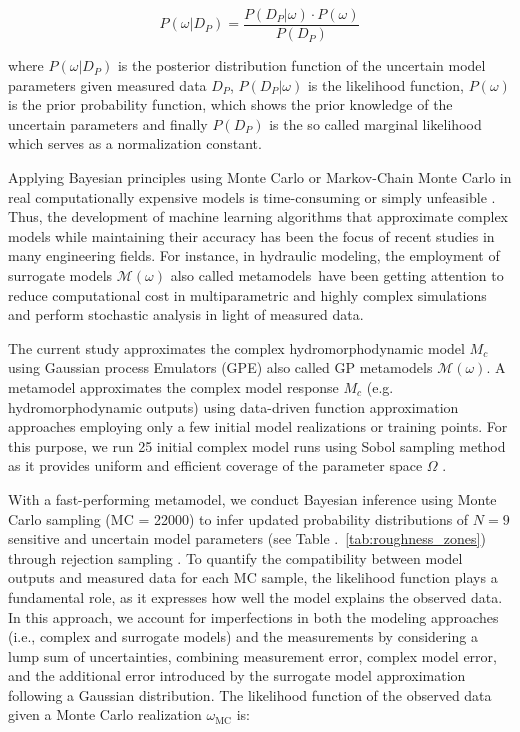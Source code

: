 \documentclass[draft,linenumbers,onecolumn]{agujournal2019} %
\begin{document}
\[
P(\omega | D_P) = \frac{P(D_P | \omega) \cdot P(\omega)}{P(D_P)}
\]

where $P(\omega | D_P)$ is the posterior distribution function of the uncertain model parameters given measured data $D_P$, $P(D_P | \omega)$  is the likelihood function,  $P(\omega)$ is the prior probability function, which  shows the prior knowledge of the uncertain parameters and finally $P(D_P)$ is the so called marginal likelihood which serves as a normalization constant.  

Applying Bayesian principles using Monte Carlo or Markov-Chain Monte Carlo in real computationally expensive models is time-consuming or simply unfeasible \cite{smith1992bayesian,oladyshkin2020bayesian3}.
Thus, the development of machine learning algorithms that approximate complex models while maintaining their accuracy has been the focus of recent studies in many engineering fields. For instance, in hydraulic modeling, the employment of surrogate models $\mathcal{M}(\omega)$ also called metamodels have been getting attention to reduce computational cost in multiparametric and highly complex simulations and perform stochastic analysis in light of measured data.

The current study approximates the complex hydromorphodynamic model $M_c$ using Gaussian process Emulators (GPE) also called GP metamodels $\mathcal{M}(\omega)$. A metamodel approximates the complex model response $M_c$ (e.g. hydromorphodynamic outputs) using data-driven function approximation approaches \cite{razavi2012review} employing only a few initial model realizations or training points. For this purpose, we run 25 initial complex model runs using Sobol sampling method as it provides uniform and efficient coverage of the parameter space $\Omega$ \cite{garud2017design}.

With a fast-performing metamodel, we conduct Bayesian inference using Monte Carlo sampling (MC = 22000) to infer updated probability distributions of $N = 9$ sensitive and uncertain model parameters (see Table .~\ref{tab:roughness_zones}) through rejection sampling \cite{beckers2020bayesian}. To quantify the compatibility between model outputs and measured data for each MC sample, the likelihood function plays a fundamental role, as it expresses how well the model explains the observed data. In this approach, we account for imperfections in both the modeling approaches (i.e., complex and surrogate models) and the measurements by considering a lump sum of uncertainties, combining measurement error, complex model error, and the additional error introduced by the surrogate model approximation following a Gaussian distribution. The likelihood function of the observed data given a Monte Carlo realization $\omega_{\text{MC}}$ is:
\end{document}
